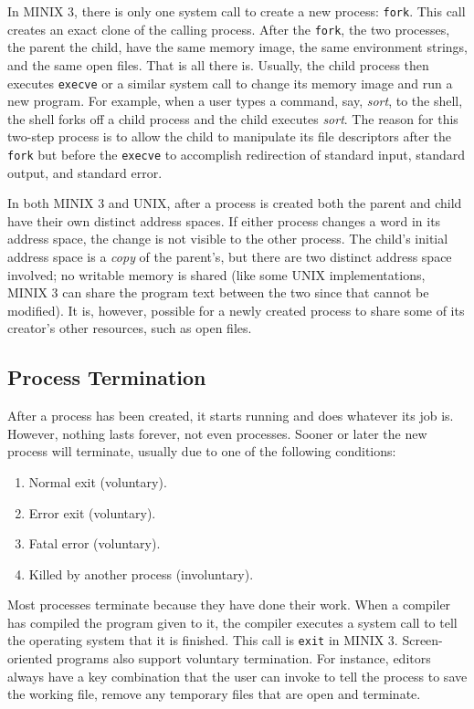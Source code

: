 \documentclass{book}
\newcommand {\sys} [1] {\textsl{#1}}
\newcommand {\cmd} [1] {\texttt{#1}}
\begin{document}
In MINIX 3, there is only one system call to create a new process: \cmd{fork}.
This call creates an exact clone of the calling process.
After the \cmd{fork}, the two processes, the parent the child, have the same memory image, the same environment strings, and the same open files.
That is all there is.
Usually, the child process then executes \cmd{execve} or a similar system call to change its memory image and run a new program.
For example, when a user types a command, say, \sys{sort}, to the shell,
the shell forks off a child process and the child executes \sys{sort}.
The reason for this two-step process is to allow the child to manipulate its file descriptors after the \cmd{fork} 
but before the \cmd{execve} to accomplish redirection of standard input, standard output, and standard error.

In both MINIX 3 and UNIX, after a process is created both the parent and child have their own distinct address spaces.
If either process changes a word in its address space, the change is not visible to the other process.
The child's initial address space is a \sys{copy} of the parent's,
but there are two distinct address space involved; no writable memory is shared (like some UNIX implementations, 
MINIX 3 can share the program text between the two since that cannot be modified).
It is, however, possible for a newly created process to share some of its creator's other resources, such as open files.

\subsection{Process Termination}
After a process has been created, it starts running and does whatever its job is.
However, nothing lasts forever, not even processes.
Sooner or later the new process will terminate, usually due to one of the following conditions:
\begin{enumerate}
  \item Normal exit (voluntary).
  \item Error exit (voluntary).
  \item Fatal error (voluntary).
  \item Killed by another process (involuntary).
\end{enumerate}

Most processes terminate because they have done their work.
When a compiler has compiled the program given to it, 
the compiler executes a system call to tell the operating system that it is finished.
This call is \cmd{exit} in MINIX 3.
Screen-oriented programs also support voluntary termination.
For instance, editors always have a key combination that the user can invoke to tell the process to save the working file, 
remove any temporary files that are open and terminate.
\end{document}
